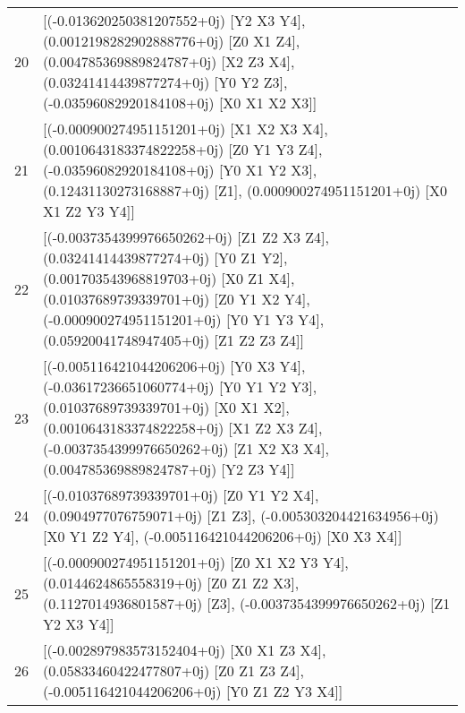 \begin{tabular}{rl}
      20 &                                                                                                                                                                       [(-0.013620250381207552+0j) [Y2 X3 Y4], (0.0012198282902888776+0j) [Z0 X1 Z4], (0.004785369889824787+0j) [X2 Z3 X4], (0.03241414439877274+0j) [Y0 Y2 Z3], (-0.03596082920184108+0j) [X0 X1 X2 X3]] \\
      21 &                                                                                                                                                                 [(-0.000900274951151201+0j) [X1 X2 X3 X4], (0.0010643183374822258+0j) [Z0 Y1 Y3 Z4], (-0.03596082920184108+0j) [Y0 X1 Y2 X3], (0.12431130273168887+0j) [Z1], (0.000900274951151201+0j) [X0 X1 Z2 Y3 Y4]] \\
      22 &                                                                                                                         [(-0.0037354399976650262+0j) [Z1 Z2 X3 Z4], (0.03241414439877274+0j) [Y0 Z1 Y2], (0.001703543968819703+0j) [X0 Z1 X4], (0.01037689739339701+0j) [Z0 Y1 X2 Y4], (-0.000900274951151201+0j) [Y0 Y1 Y3 Y4], (0.05920041748947405+0j) [Z1 Z2 Z3 Z4]] \\
      23 &                                                                                                                         [(-0.005116421044206206+0j) [Y0 X3 Y4], (-0.03617236651060774+0j) [Y0 Y1 Y2 Y3], (0.01037689739339701+0j) [X0 X1 X2], (0.0010643183374822258+0j) [X1 Z2 X3 Z4], (-0.0037354399976650262+0j) [Z1 X2 X3 X4], (0.004785369889824787+0j) [Y2 Z3 Y4]] \\
      24 &                                                                                                                                                                                                              [(-0.01037689739339701+0j) [Z0 Y1 Y2 X4], (0.0904977076759071+0j) [Z1 Z3], (-0.005303204421634956+0j) [X0 Y1 Z2 Y4], (-0.005116421044206206+0j) [X0 X3 X4]] \\
      25 &                                                                                                                                                                                                            [(-0.000900274951151201+0j) [Z0 X1 X2 Y3 Y4], (0.0144624865558319+0j) [Z0 Z1 Z2 X3], (0.1127014936801587+0j) [Z3], (-0.0037354399976650262+0j) [Z1 Y2 X3 Y4]] \\
      26 &                                                                                                                                                                                                                                          [(-0.002897983573152404+0j) [X0 X1 Z3 X4], (0.05833460422477807+0j) [Z0 Z1 Z3 Z4], (-0.005116421044206206+0j) [Y0 Z1 Z2 Y3 X4]] \\

\end{tabular}
